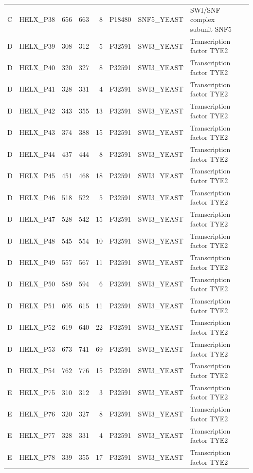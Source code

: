 \begin{longtable}{@{}llrrrrllp{5.2cm}@{}}
  C & HELX_P38 & 656 & 663 & 8 & P18480 & SNF5_YEAST & SWI/SNF complex subunit SNF5 \\
  D & HELX_P39 & 308 & 312 & 5 & P32591 & SWI3_YEAST & Transcription factor TYE2 \\
  D & HELX_P40 & 320 & 327 & 8 & P32591 & SWI3_YEAST & Transcription factor TYE2 \\
  D & HELX_P41 & 328 & 331 & 4 & P32591 & SWI3_YEAST & Transcription factor TYE2 \\
  D & HELX_P42 & 343 & 355 & 13 & P32591 & SWI3_YEAST & Transcription factor TYE2 \\
  D & HELX_P43 & 374 & 388 & 15 & P32591 & SWI3_YEAST & Transcription factor TYE2 \\
  D & HELX_P44 & 437 & 444 & 8 & P32591 & SWI3_YEAST & Transcription factor TYE2 \\
  D & HELX_P45 & 451 & 468 & 18 & P32591 & SWI3_YEAST & Transcription factor TYE2 \\
  D & HELX_P46 & 518 & 522 & 5 & P32591 & SWI3_YEAST & Transcription factor TYE2 \\
  D & HELX_P47 & 528 & 542 & 15 & P32591 & SWI3_YEAST & Transcription factor TYE2 \\
  D & HELX_P48 & 545 & 554 & 10 & P32591 & SWI3_YEAST & Transcription factor TYE2 \\
  D & HELX_P49 & 557 & 567 & 11 & P32591 & SWI3_YEAST & Transcription factor TYE2 \\
  D & HELX_P50 & 589 & 594 & 6 & P32591 & SWI3_YEAST & Transcription factor TYE2 \\
  D & HELX_P51 & 605 & 615 & 11 & P32591 & SWI3_YEAST & Transcription factor TYE2 \\
  D & HELX_P52 & 619 & 640 & 22 & P32591 & SWI3_YEAST & Transcription factor TYE2 \\
  D & HELX_P53 & 673 & 741 & 69 & P32591 & SWI3_YEAST & Transcription factor TYE2 \\
  D & HELX_P54 & 762 & 776 & 15 & P32591 & SWI3_YEAST & Transcription factor TYE2 \\
  E & HELX_P75 & 310 & 312 & 3 & P32591 & SWI3_YEAST & Transcription factor TYE2 \\
  E & HELX_P76 & 320 & 327 & 8 & P32591 & SWI3_YEAST & Transcription factor TYE2 \\
  E & HELX_P77 & 328 & 331 & 4 & P32591 & SWI3_YEAST & Transcription factor TYE2 \\
  E & HELX_P78 & 339 & 355 & 17 & P32591 & SWI3_YEAST & Transcription factor TYE2 \\

\end{longtable}
